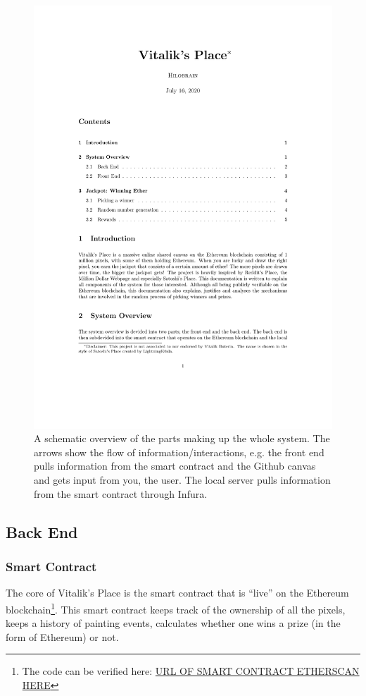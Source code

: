 \documentclass[a4paper]{article}
\begin{document}
\begin{figure}[H]
    \centering
    \includegraphics[width=\textwidth]{Vitaliks_Place.pdf}
    \caption{A schematic overview of the parts making up the whole system. The arrows show the flow of information/interactions, e.g. the front end pulls information from the smart contract and the Github canvas and gets input from you, the user. The local server pulls information from the smart contract through Infura.}
    \label{fig:1}
\end{figure}

\subsection{Back End}

\subsubsection{Smart Contract}
The core of Vitalik's Place is the smart contract that is ``live'' on the Ethereum blockchain\footnote{The code can be verified here: \url{URL OF SMART CONTRACT ETHERSCAN HERE}}. This smart contract keeps track of the ownership of all the pixels, keeps a history of painting events, calculates whether one wins a prize (in the form of Ethereum) or not.
\end{document}

